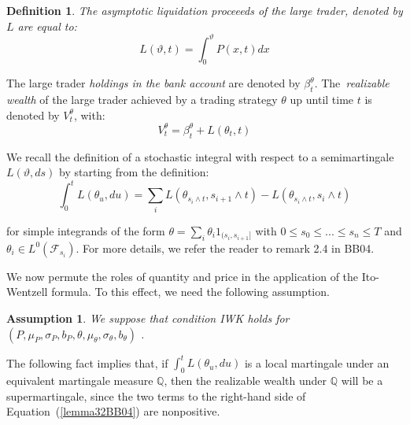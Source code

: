 \documentclass{article}
\newtheorem{definition}{Definition}
\newtheorem{assumption}{Assumption}
\begin{document}


\begin{definition}
The \textit{asymptotic liquidation proceeeds} of the large trader, denoted
by $L$ are equal to:\
\begin{equation*}
L(\vartheta ,t)=\int_{0}^{\vartheta }P(x,t)dx
\end{equation*}
\end{definition}

The large trader \textit{holdings in the bank account} are denoted by $\beta
_{t}^{\theta }$. The\textit{\ realizable wealth} of the large trader
achieved by a trading strategy $\theta $ up until time $t$ is denoted by $%
V_{t}^{\theta }$, with:%
\begin{equation*}
V_{t}^{\theta }=\beta _{t}^{\theta }+L(\theta _{t},t)
\end{equation*}

We recall the definition of a stochastic integral with respect to a
semimartingale $L(\vartheta ,ds)$ by starting from the definition:%
\begin{equation*}
\int_{0}^{t}L(\theta _{u},du)=\sum_{i}L(\theta _{s_{i}\wedge
t},s_{i+1}\wedge t)-L(\theta _{s_{i}\wedge t},s_{i}\wedge t)
\end{equation*}

for simple integrands of the form $\theta =\sum_{i}\theta
_{i}1_{(s_{i},s_{i+1}]}$ with $0\leq s_{0}\leq ...\leq s_{n}\leq T$ and $%
\theta _{i}\in L^{0}(\mathcal{F}_{s_{i}})$. For more details, we refer the
reader to remark 2.4 in BB04.

\bigskip

We now permute the roles of quantity and price in the application of the
Ito-Wentzell formula. To this effect, we need the following assumption.



\begin{assumption}
\label{ass::iwk_condition_P} We suppose that condition IWK holds for $(P,\mu
_{P},\sigma _{P},b_{P},\theta ,\mu _{\theta },\sigma _{\theta },b_{\theta })$%
.\bigskip
\end{assumption}

The following fact implies that, if $\int_{0}^{t}L(\theta _{u},du)$ is a
local martingale under an equivalent martingale measure $\mathbb{Q}$, then
the realizable wealth under $\mathbb{Q}$ will be a supermartingale, since
the two terms to the right-hand side of Equation~(\ref{lemma32BB04}) are
nonpositive.
\end{document}
